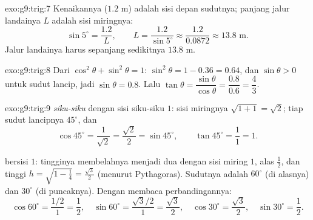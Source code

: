 \begin{solution}{exo:g9:trig:7}
Kenaikannya ($1.2$ m) adalah sisi depan sudutnya; panjang jalur
landainya $L$ adalah sisi miringnya:
\[
\sin 5^\circ = \frac{1.2}{L},
\qquad
L = \frac{1.2}{\sin 5^\circ} \approx \frac{1.2}{0.0872} \approx 13.8
\text{ m}.
\]
Jalur landainya harus sepanjang sedikitnya $13.8$ m.
\end{solution}

\begin{solution}{exo:g9:trig:8}
Dari $\cos^2\theta + \sin^2\theta = 1$:
$\sin^2\theta = 1 - 0.36 = 0.64$, dan $\sin\theta > 0$ untuk sudut
lancip, jadi $\sin\theta = 0.8$. Lalu
$\tan\theta = \dfrac{\sin\theta}{\cos\theta} = \dfrac{0.8}{0.6} =
\dfrac43$.
\end{solution}

\begin{solution}{exo:g9:trig:9}
\emph{ siku-siku} dengan sisi siku-siku $1$: sisi
miringnya $\sqrt{1 + 1} = \sqrt2$; tiap sudut lancipnya $45^\circ$, dan
\[
\cos 45^\circ = \frac{1}{\sqrt2} = \frac{\sqrt2}{2} = \sin 45^\circ,
\qquad
\tan 45^\circ = \frac11 = 1 .
\]

\emph{} bersisi $1$: tingginya membelahnya menjadi
dua  dengan sisi miring $1$, alas $\frac12$, dan
tinggi $h = \sqrt{1 - \frac14} = \frac{\sqrt3}{2}$ (menurut
Pythagoras). Sudutnya adalah $60^\circ$ (di alasnya) dan $30^\circ$
(di puncaknya). Dengan membaca perbandingannya:
\[
\cos 60^\circ = \frac{1/2}{1} = \frac12, \quad
\sin 60^\circ = \frac{\sqrt3/2}{1} = \frac{\sqrt3}{2}, \quad
\cos 30^\circ = \frac{\sqrt3}{2}, \quad
\sin 30^\circ = \frac12 .
\]
\end{solution}

